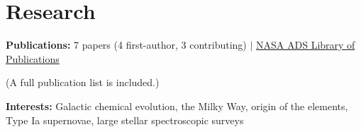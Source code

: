\section*{Research}

\noindent
{\bf Publications:} 7 papers (4 first-author, 3 contributing) $\vert$
\href{https://ui.adsabs.harvard.edu/public-libraries/EW_Q9nAyQkue5ChHIAT6SQ}{NASA ADS Library of Publications}

\noindent (A full publication list is included.)

\vspace{12pt}
\noindent
{\bf Interests:}
Galactic chemical evolution, the Milky Way, origin of the elements, Type Ia supernovae, large stellar spectroscopic surveys